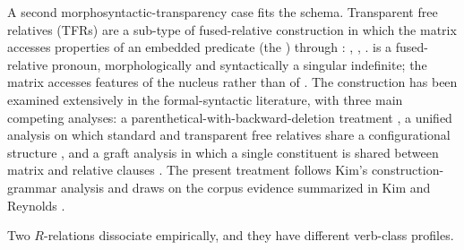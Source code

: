 
A second morphosyntactic-transparency case fits the schema. Transparent free relatives (TFRs) are a sub-type of fused-relative construction \autocite[ch.~12, §6.3]{huddleston-pullum-2002} in which the matrix accesses properties of an embedded predicate (the ) through : , , .  is a fused-relative pronoun, morphologically and syntactically a singular indefinite; the matrix accesses features of the nucleus rather than of . The construction has been examined extensively in the formal-syntactic literature, with three main competing analyses: a parenthetical-with-backward-deletion treatment \autocite{wilder-1999-transparent-free-relatives,schelfhout-coppen-oostdijk-2003-transparent-free-relatives}, a unified analysis on which standard and transparent free relatives share a configurational structure \autocite{grosu-2003-unified-theory-tfrs,grosu-2016-semantics-syntax-morphology-tfrs}, and a graft analysis in which a single constituent is shared between matrix and relative clauses \autocite{vanriemsdijk-2006-free-relatives}. The present treatment follows Kim's \autocite*[ch.~6.8]{kim-2026-form-function} construction-grammar analysis and draws on the corpus evidence summarized in Kim and Reynolds \autocite*{kim-reynolds-2026-tfr-two-kinds}.

Two $R$-relations dissociate empirically, and they have different verb-class profiles.

\ea\label{ex:tfr-r-relations}
\ea {}
\ex {}
\ex {}
\z
\z

